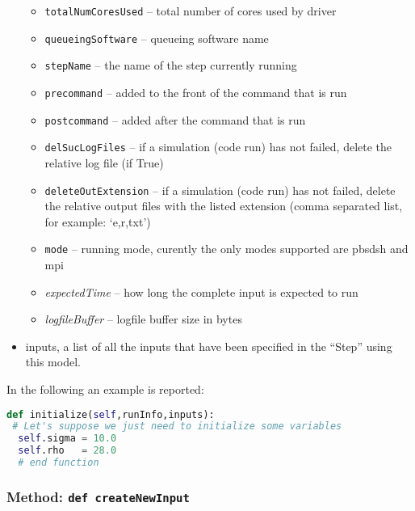\begin{itemize}
\begin{itemize}
    \item \texttt{totalNumCoresUsed} -- total number of cores used by driver
    \item \texttt{queueingSoftware} -- queueing software name
    \item \texttt{stepName} -- the name of the step currently running
    \item \texttt{precommand} -- added to the front of the command that is run
    \item \texttt{postcommand} -- added after the command that is run
    \item \texttt{delSucLogFiles} -- if a simulation (code run) has not failed,
    delete the relative log file (if True)
    \item \texttt{deleteOutExtension} -- if a simulation (code run) has not
    failed, delete the relative output files with the listed extension (comma
    separated list, for example: `e,r,txt')
    \item \texttt{mode} -- running mode, curently the only modes supported are
    pbsdsh and mpi
    \item \textit{expectedTime} -- how long the complete input is expected to
    run
    \item \textit{logfileBuffer} -- logfile buffer size in bytes
  \end{itemize}
  \item inputs, a list of all the inputs that have been specified in the
  ``Step'' using this model.
\end{itemize}
In the following an example is reported:
\begin{lstlisting}[language=python]
def initialize(self,runInfo,inputs):
 # Let's suppose we just need to initialize some variables
  self.sigma = 10.0
  self.rho   = 28.0
  # end function
\end{lstlisting}
\subsubsection{Method: \texttt{def createNewInput}}
\label{subsubsec:externalcreateNewInput}

